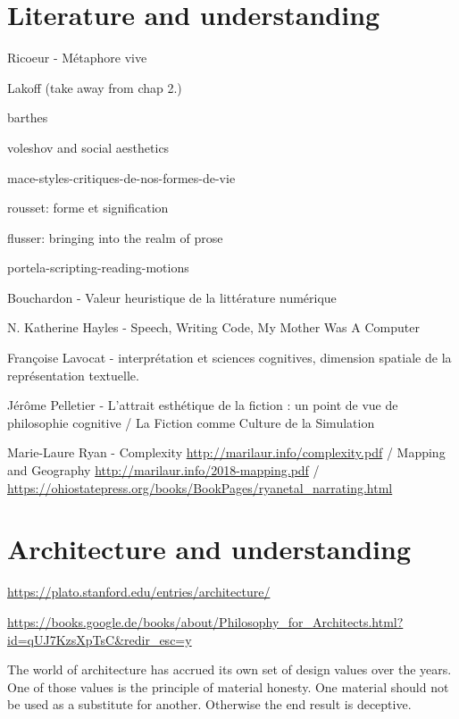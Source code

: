 \section{Literature and understanding}
\label{sec:aesthetic-literature}


Ricoeur - Métaphore vive

Lakoff (take away from chap 2.)

barthes 

voleshov and social aesthetics

mace-styles-critiques-de-nos-formes-de-vie

rousset: forme et signification

flusser: bringing into the realm of prose

portela-scripting-reading-motions


Bouchardon - Valeur heuristique de la littérature numérique

N. Katherine Hayles - Speech, Writing Code, My Mother Was A Computer


Françoise Lavocat - interprétation et sciences cognitives, dimension spatiale de la représentation textuelle.

Jérôme Pelletier -  L'attrait esthétique de la fiction : un point de vue de philosophie cognitive /  La Fiction comme Culture de la Simulation 

Marie-Laure Ryan - Complexity \url{http://marilaur.info/complexity.pdf} / Mapping and Geography \url{http://marilaur.info/2018-mapping.pdf} / \url{https://ohiostatepress.org/books/BookPages/ryanetal_narrating.html}

\section{Architecture and understanding}
\label{sec:arch-understanding}


\url{https://plato.stanford.edu/entries/architecture/}

\url{https://books.google.de/books/about/Philosophy_for_Architects.html?id=qUJ7KzsXpTsC&redir_esc=y}

The world of architecture has accrued its own set of design values over the years. One of those values is the principle of material honesty. One material should not be used as a substitute for another. Otherwise the end result is deceptive.\citep{keith_resilient_2016}

